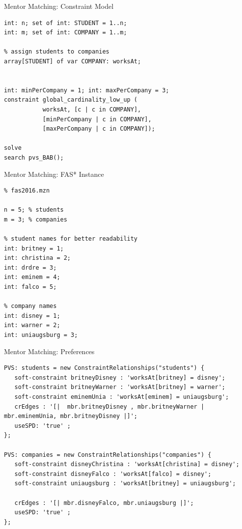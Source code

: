 \begin{frame}[fragile]{Mentor Matching: Constraint Model}
\begin{lstlisting}
int: n; set of int: STUDENT = 1..n;
int: m; set of int: COMPANY = 1..m;

% assign students to companies
array[STUDENT] of var COMPANY: worksAt;


int: minPerCompany = 1; int: maxPerCompany = 3;
constraint global_cardinality_low_up ( 
           worksAt, [c | c in COMPANY], 
           [minPerCompany | c in COMPANY], 
           [maxPerCompany | c in COMPANY]); 
           
solve 
search pvs_BAB();
\end{lstlisting}
\end{frame}

\begin{frame}[fragile]{Mentor Matching: FAS* Instance}
\begin{lstlisting}
% fas2016.mzn

n = 5; % students
m = 3; % companies

% student names for better readability 
int: britney = 1;
int: christina = 2;
int: drdre = 3; 
int: eminem = 4; 
int: falco = 5; 

% company names 
int: disney = 1;
int: warner = 2;
int: uniaugsburg = 3;
\end{lstlisting}

\end{frame}

\begin{frame}[fragile]{Mentor Matching: Preferences}
\begin{lstlisting}
PVS: students = new ConstraintRelationships("students") {
   soft-constraint britneyDisney : 'worksAt[britney] = disney';
   soft-constraint britneyWarner : 'worksAt[britney] = warner';
   soft-constraint eminemUnia : 'worksAt[eminem] = uniaugsburg';
   crEdges : '[|  mbr.britneyDisney , mbr.britneyWarner | mbr.eminemUnia, mbr.britneyDisney |]';
   useSPD: 'true' ;
}; 

PVS: companies = new ConstraintRelationships("companies") {
   soft-constraint disneyChristina : 'worksAt[christina] = disney';
   soft-constraint disneyFalco : 'worksAt[falco] = disney';
   soft-constraint uniaugsburg : 'worksAt[britney] = uniaugsburg';
   
   crEdges : '[| mbr.disneyFalco, mbr.uniaugsburg |]';
   useSPD: 'true' ;
}; 
\end{lstlisting}
\end{frame}

